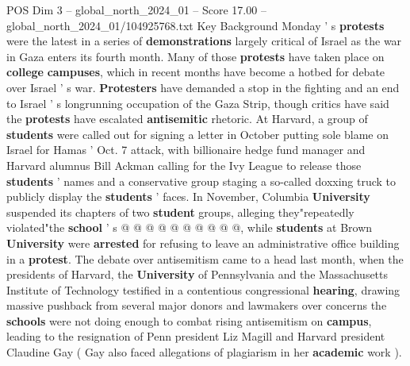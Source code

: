 \begin{textsample}{POS Dim 3 – global\_north\_2024\_01 – Score 17.00 – global\_north\_2024\_01/104925768.txt}
Key Background Monday ' s \textbf{protests} were the latest in a series of \textbf{demonstrations} largely critical of Israel as the war in Gaza enters its fourth month.
Many of those \textbf{protests} have taken place on \textbf{college} \textbf{campuses}, which in recent months have become a hotbed for debate over Israel ' s war. \textbf{Protesters} have demanded a stop in the fighting and an end to Israel ' s longrunning occupation of the Gaza Strip, though critics have said the \textbf{protests} have escalated \textbf{antisemitic} rhetoric.
At Harvard, a group of \textbf{students} were called out for signing a letter in October putting sole blame on Israel for Hamas ' Oct. 7 attack, with billionaire hedge fund manager and Harvard alumnus Bill Ackman calling for the Ivy League to release those \textbf{students} ' names and a conservative group staging a so-called doxxing truck to publicly display the \textbf{students} ' faces.
In November, Columbia \textbf{University} suspended its chapters of two \textbf{student} groups, alleging they"repeatedly violated"the \textbf{school} ' s @ @ @ @ @ @ @ @ @ @, while \textbf{students} at Brown \textbf{University} were \textbf{arrested} for refusing to leave an administrative office building in a \textbf{protest}.
The debate over antisemitism came to a head last month, when the presidents of Harvard, the \textbf{University} of Pennsylvania and the Massachusetts Institute of Technology testified in a contentious congressional \textbf{hearing}, drawing massive pushback from several major donors and lawmakers over concerns the \textbf{schools} were not doing enough to combat rising antisemitism on \textbf{campus}, leading to the resignation of Penn president Liz Magill and Harvard president Claudine Gay ( Gay also faced allegations of plagiarism in her \textbf{academic} work ).

\end{textsample}

